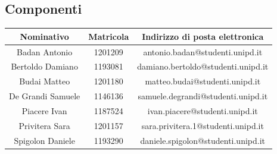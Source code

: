 \subsection{Componenti}
\begin{table}[H]
	\centering
	\renewcommand{\arraystretch}{1.5}
	\begin{tabular}{|c|c|c|}
		\hline
		\rowcolor{lighter-grayer}
		Nominativo & Matricola & Indirizzo di posta elettronica \\
		\hline
		Badan Antonio & 1201209 & antonio.badan@studenti.unipd.it\\
		\hline
		Bertoldo Damiano & 1193081 & damiano.bertoldo@studenti.unipd.it \\
		\hline
		Budai Matteo & 1201180 &  matteo.budai@studenti.unipd.it \\
		\hline
		De Grandi Samuele & 1146136 & samuele.degrandi@studenti.unipd.it \\
		\hline
		Piacere Ivan & 1187524 & ivan.piacere@studenti.unipd.it \\
		\hline
		Privitera Sara & 1201157 & sara.privitera.1@studenti.unipd.it \\
		\hline
		Spigolon Daniele & 1193290 & daniele.spigolon@studenti.unipd.it \\
		\hline
	\end{tabular}
\end{table}